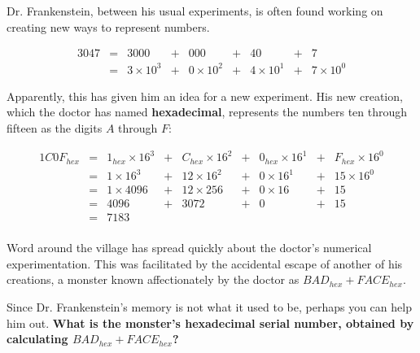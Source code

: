 

Dr. Frankenstein, between his usual experiments,
is often found working on creating new ways to represent numbers.


{\Large
\[
  \begin{array}{rcccccccc}
  3047 & = & 3000 &+& 000 &+& 40 &+& 7 \\
       & = & 3\times10^3 &+& 0\times10^2 &+& 4\times10^1 &+& 7\times10^0
  \end{array}
\]
}

Apparently, this has given him an idea for a new experiment.
 His new creation, which the
doctor has named \textbf{hexadecimal}, represents the numbers
ten through fifteen as the digits \(A\) through \(F\):

{\Large
\[
  \begin{array}{rcccccccc}
  1C0F_{hex} & = & 1_{hex}\times16^3 &+& C_{hex}\times16^2 &+& 0_{hex}\times16^1 &+& F_{hex}\times16^0 \\
             & = & 1\times16^3 &+& 12\times16^2 &+& 0\times16^1 &+& 15\times16^0 \\
             & = & 1\times4096 &+& 12\times256 &+& 0\times16 &+& 15 \\
             & = & 4096 &+& 3072 &+& 0 &+& 15 \\
             & = & 7183\\
  \end{array}
\]
}

Word around the village has spread quickly about the doctor's numerical
experimentation. This was facilitated by the accidental escape of another
of his creations, a monster known affectionately by the doctor as
\(BAD_{hex}+FACE_{hex}\).


Since Dr. Frankenstein's memory is not what it used to be, perhaps you can
help him out. \textbf{What is the monster's hexadecimal serial number, obtained
by calculating \(BAD_{hex}+FACE_{hex}\)?}
